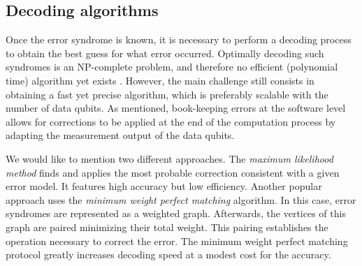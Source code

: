 \subsection{Decoding algorithms}
Once the error syndrome is known, it is necessary to perform a decoding process
to obtain the best guess for what error occurred. Optimally decoding such
syndromes is an NP-complete problem, and therefore no efficient (polynomial
time) algorithm yet exists \cite{Berlekamp}. However, the main challenge still
consists in obtaining a fast yet precise algorithm, which is preferably scalable
with the number of data qubits. As mentioned, book-keeping errors at the
software level allows for corrections to be applied at the end of the
computation process by adapting the measurement output of the data qubits.

We would like to mention two different approaches. The \textit{maximum
  likelihood method} \cite{Varsamopoulos_2020} finds and applies the most probable
correction consistent with a given error model. It features high accuracy but
low efficiency. Another popular approach uses the \textit{minimum weight perfect
  matching} \cite{fowler2013minimum} algorithm. In this case, error syndromes
are represented as a weighted graph. Afterwards, the vertices of this graph are
paired minimizing their total weight. This pairing establishes the operation
necessary to correct the error. The minimum weight perfect
matching protocol greatly increases decoding speed at a modest cost for the
accuracy.

